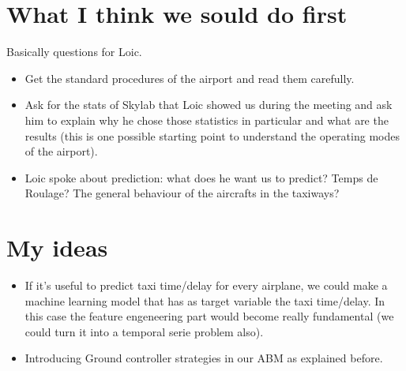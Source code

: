\documentclass{article}
\begin{document}
\section*{What I think we sould do first}
Basically questions for Loic.
\begin{itemize}
\item Get the standard procedures of the airport and read them carefully.
\item Ask for the stats of Skylab that Loic showed us during the meeting and ask him to explain why he chose those statistics in particular and what are the results (this is one possible starting point to understand the operating modes of the airport).
\item Loic spoke about prediction: what does he want us to predict? Temps de Roulage? The general behaviour of the aircrafts in the taxiways?
\end{itemize}

\section*{My ideas}
\begin{itemize}
	\item If it's useful to predict taxi time/delay for every airplane, we could make a machine learning model that has as target variable the taxi time/delay. In this case the feature engeneering part would become really fundamental (we could turn it into a temporal serie problem also).
	\item Introducing Ground controller strategies in our ABM as explained before.
\end{itemize}
\end{document}
